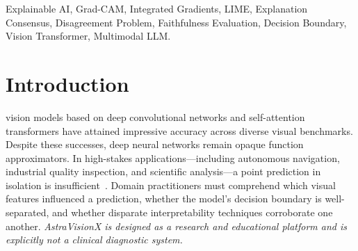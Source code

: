 \documentclass[journal,10pt,twocolumn]{IEEEtran}
\begin{document}
\begin{abstract}
Through an empirical evaluation across a 100-class ImageNet-1K benchmark, we observe a global explanation agreement of $A_{\text{global}} = 21.33\% \pm 1.44\%$ IoU ($33.97\% \pm 1.90\%$ Dice) at the top-20\% salient area threshold. While significantly exceeding the uniform random chance baseline ($11.11\%$), this overlap falls slightly below the empirical cross-image spatial null ($26.30\%$) induced by natural photographic center bias. For equal-area masks, this indicates that approximately $66\%$ of salient pixels identified by one explainer are unshared by another ($1 - \text{Dice}$), empirically substantiating the ``Disagreement Problem in XAI'' and demonstrating that single-method interpretability is fundamentally precarious. Faithfulness evaluations via deletion and insertion curves reveal that Integrated Gradients attains a deletion AUC of $0.152$ compared to $0.204$ for random masking, while Grad-CAM achieves high insertion sufficiency ($0.701$). Furthermore, cascading parameter randomization demonstrates that attributions collapse as randomization proceeds from classification heads ($\rho = 0.304$) into convolutional blocks ($\rho = -0.022$). The decision margin $m = p_1 - p_2$ achieves an AUROC of $0.998$ ($95\%$ bootstrap CI: $[0.985, 1.000]$) for misclassification detection, with accuracy dropping from $100.0\%$ for $m \ge 0.50$ to $16.7\%$ for $m < 0.20$. The platform is implemented as an asynchronous FastAPI microservice with a responsive glassmorphic dashboard, client-side Web Speech interaction, and automated PDF dossier generation.
\end{abstract}

\begin{IEEEkeywords}
Explainable AI, Grad-CAM, Integrated Gradients, LIME, Explanation Consensus, Disagreement Problem, Faithfulness Evaluation, Decision Boundary, Vision Transformer, Multimodal LLM.
\end{IEEEkeywords}

\section{Introduction}
 vision models based on deep convolutional networks and self-attention transformers have attained impressive accuracy across diverse visual benchmarks. Despite these successes, deep neural networks remain opaque function approximators. In high-stakes applications—including autonomous navigation, industrial quality inspection, and scientific analysis—a point prediction in isolation is insufficient~\cite{selvaraju2017gradcam}. Domain practitioners must comprehend which visual features influenced a prediction, whether the model's decision boundary is well-separated, and whether disparate interpretability techniques corroborate one another. \textit{AstraVisionX is designed as a research and educational platform and is explicitly not a clinical diagnostic system.}
\end{document}
